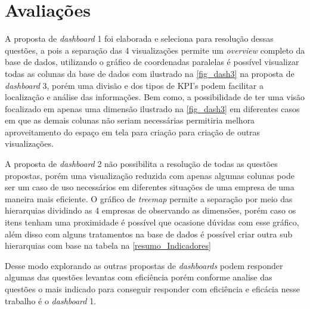 \documentclass[
	12pt,				%
	openright,			%
	oneside,			%
	a4paper,			%
	english,			%
	brazil				%
	]{abntex2}
\begin{document}
\section{Avaliações}

A proposta de \textit{dashboard} 1 foi elaborada e seleciona para resolução dessas questões, a pois a separação das 4 visualizações permite um \textit{overview} completo da base de dados, utilizando o gráfico de coordenadas paralelas é possível visualizar todas as colunas da base de dados com ilustrado na \autoref{fig_dash3} na proposta de \textit{dashboard} 3, porém uma divisão e dos tipos de KPI's podem facilitar a localização e análise das informações. Bem como, a possibilidade de ter uma visão focalizado em apenas uma dimensão ilustrado na \autoref{fig_dash3} em diferentes casos em que as demais colunas não seriam necessárias permitiria melhora aproveitamento do espaço em tela para criação para criação de outras visualizações.

A proposta de \textit{dashboard} 2 não possibilita a resolução de todas as questões propostas, porém uma visualização reduzida com apenas algumas colunas pode ser um caso de uso necessários em diferentes situações de uma empresa de uma maneira mais eficiente. O gráfico de \textit{treemap} permite a separação por meio das hierarquias dividindo as 4 empresas de observando as dimensões, porém caso os itens tenham uma proximidade é possível que ocasione dúvidas com esse gráfico, além disso com alguns tratamentos na base de dados é possível criar outra sub hierarquias com base na tabela na \autoref{resumo_Indicadores}

Desse modo explorando as outras propostas de \textit{dashboards} podem responder algumas das questões levantas com eficiência porém conforme analise das questões o mais indicado para conseguir responder com eficiência e eficácia nesse trabalho é o \textit{ dashboard} 1.
\end{document}
